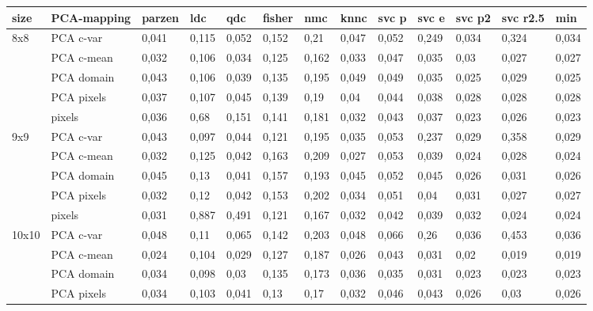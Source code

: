 \documentclass{article}
\begin{document}
\begin{table}[H]
  \small
  \centering
    \begin{tabular}{l|l|llllllllll|l|}
    \hline
    \textbf{size} & \textbf{PCA-mapping} & \textbf{parzen} & \textbf{ldc} & \textbf{qdc} & \textbf{fisher} & \textbf{nmc} & \textbf{knnc} & \textbf{svc p} & \textbf{svc e} & \textbf{svc p2} & \textbf{svc r2.5} & \textbf{min} \\
    \hline \hline
    8x8   & PCA c-var & 0,041 & 0,115 & 0,052 & 0,152 & 0,21  & 0,047 & 0,052 & 0,249 & 0,034 & 0,324 & 0,034 \\
          & PCA c-mean & 0,032 & 0,106 & 0,034 & 0,125 & 0,162 & 0,033 & 0,047 & 0,035 & 0,03  & 0,027 & 0,027 \\
          & PCA domain & 0,043 & 0,106 & 0,039 & 0,135 & 0,195 & 0,049 & 0,049 & 0,035 & 0,025 & 0,029 & 0,025 \\
          & PCA pixels & 0,037 & 0,107 & 0,045 & 0,139 & 0,19  & 0,04  & 0,044 & 0,038 & 0,028 & 0,028 & 0,028 \\
          & pixels & 0,036 & 0,68  & 0,151 & 0,141 & 0,181 & 0,032 & 0,043 & 0,037 & 0,023 & 0,026 & 0,023 \\ \hline
    9x9   & PCA c-var & 0,043 & 0,097 & 0,044 & 0,121 & 0,195 & 0,035 & 0,053 & 0,237 & 0,029 & 0,358 & 0,029 \\
          & PCA c-mean & 0,032 & 0,125 & 0,042 & 0,163 & 0,209 & 0,027 & 0,053 & 0,039 & 0,024 & 0,028 & 0,024 \\
          & PCA domain & 0,045 & 0,13  & 0,041 & 0,157 & 0,193 & 0,045 & 0,052 & 0,045 & 0,026 & 0,031 & 0,026 \\
          & PCA pixels & 0,032 & 0,12  & 0,042 & 0,153 & 0,202 & 0,034 & 0,051 & 0,04  & 0,031 & 0,027 & 0,027 \\
          & pixels & 0,031 & 0,887 & 0,491 & 0,121 & 0,167 & 0,032 & 0,042 & 0,039 & 0,032 & 0,024 & 0,024 \\ \hline
    10x10 & PCA c-var & 0,048 & 0,11  & 0,065 & 0,142 & 0,203 & 0,048 & 0,066 & 0,26  & 0,036 & 0,453 & 0,036 \\
          & PCA c-mean & 0,024 & 0,104 & 0,029 & 0,127 & 0,187 & 0,026 & 0,043 & 0,031 & 0,02  & 0,019 & 0,019 \\
          & PCA domain & 0,034 & 0,098 & 0,03  & 0,135 & 0,173 & 0,036 & 0,035 & 0,031 & 0,023 & 0,023 & 0,023 \\
          & PCA pixels & 0,034 & 0,103 & 0,041 & 0,13  & 0,17  & 0,032 & 0,046 & 0,043 & 0,026 & 0,03  & 0,026 \\

\end{tabular}
\end{table}
\end{document}
